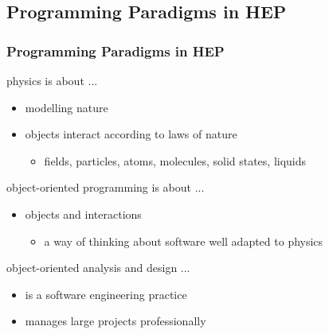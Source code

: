 \documentclass[9pt,handout]{beamer}
\begin{document}
\subsection[OOP in HEP]{Programming Paradigms in HEP}
\begin{frame}
\frametitle{Programming Paradigms in HEP}
\normalsize
\begin{block}{physics is about ...}
  \begin{itemize}
  \item \alert<4->{modelling nature}
  \item objects interact according to laws of nature
    \begin{itemize}
    \item fields, particles, atoms, molecules, solid states, liquids
    \end{itemize}
  \end{itemize}
\end{block}
\vfill
\pause
\begin{block}{object-oriented programming is about ...}
  \begin{itemize}
  \item \alert<4->{objects and interactions}
    \begin{itemize}
    \item a way of thinking about software well adapted to
      physics
    \end{itemize}

  \end{itemize}
\end{block}
\vfill
\pause
\begin{block}{object-oriented analysis and design ...}
  \begin{itemize}
  \item is a software engineering practice
  \item \alert<4->{manages large projects professionally}
  \end{itemize}
\end{block}
\end{frame}
\end{document}
